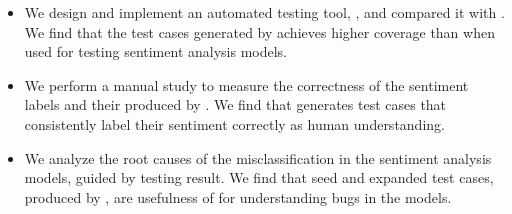 \begin{itemize}[topsep=3pt,itemsep=3pt,partopsep=0ex,parsep=0ex,leftmargin=*]
\item We design and implement an automated testing tool, \tool, and compared it with \Cklst. We find that the test cases generated by \tool achieves higher coverage than \Cklst when used for testing sentiment analysis models.
%
\item We perform a manual study to
measure the correctness of the sentiment labels and their \lcs produced by \tool. We find that \tool generates test cases that consistently label their sentiment correctly as human understanding.
%
\item We analyze the root causes of the misclassification in the sentiment analysis models, guided by \tool testing result. We find that seed and expanded test cases, produced by \tool, are usefulness of \tool for understanding bugs in the models.
\end{itemize}








